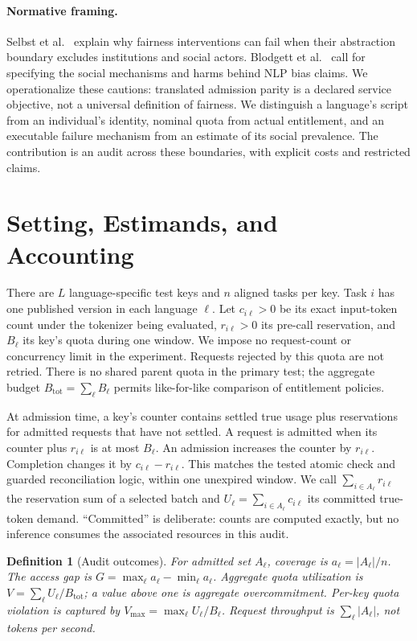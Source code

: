 \documentclass[manuscript,screen]{acmart}
\newtheorem{definition}{Definition}
\begin{document}
\paragraph{Normative framing.}
Selbst et al.~\cite{selbst2019} explain why fairness interventions can fail when their abstraction boundary excludes institutions and social actors. Blodgett et al.~\cite{blodgett-etal-2020-language} call for specifying the social mechanisms and harms behind NLP bias claims. We operationalize these cautions: translated admission parity is a declared service objective, not a universal definition of fairness. We distinguish a language's script from an individual's identity, nominal quota from actual entitlement, and an executable failure mechanism from an estimate of its social prevalence. The contribution is an audit across these boundaries, with explicit costs and restricted claims.

\section{Setting, Estimands, and Accounting}
There are $L$ language-specific test keys and $n$ aligned tasks per key. Task $i$ has one published version in each language $\ell$. Let $c_{i\ell}>0$ be its exact input-token count under the tokenizer being evaluated, $r_{i\ell}>0$ its pre-call reservation, and $B_\ell$ its key's quota during one window. We impose no request-count or concurrency limit in the experiment. Requests rejected by this quota are not retried. There is no shared parent quota in the primary test; the aggregate budget $B_{\mathrm{tot}}=\sum_\ell B_\ell$ permits like-for-like comparison of entitlement policies.

At admission time, a key's counter contains settled true usage plus reservations for admitted requests that have not settled. A request is admitted when its counter plus $r_{i\ell}$ is at most $B_\ell$. An admission increases the counter by $r_{i\ell}$. Completion changes it by $c_{i\ell}-r_{i\ell}$. This matches the tested atomic check and guarded reconciliation logic, within one unexpired window. We call $\sum_{i\in A_\ell}r_{i\ell}$ the reservation sum of a selected batch and $U_\ell=\sum_{i\in A_\ell}c_{i\ell}$ its committed true-token demand. ``Committed'' is deliberate: counts are computed exactly, but no inference consumes the associated resources in this audit.

\begin{definition}[Audit outcomes]
For admitted set $A_\ell$, coverage is $a_\ell=|A_\ell|/n$. The access gap is $G=\max_\ell a_\ell-\min_\ell a_\ell$. Aggregate quota utilization is $V=\sum_\ell U_\ell/B_{\mathrm{tot}}$; a value above one is aggregate overcommitment. Per-key quota violation is captured by $V_{\max}=\max_\ell U_\ell/B_\ell$. Request throughput is $\sum_\ell |A_\ell|$, not tokens per second.
\end{definition}
\end{document}
